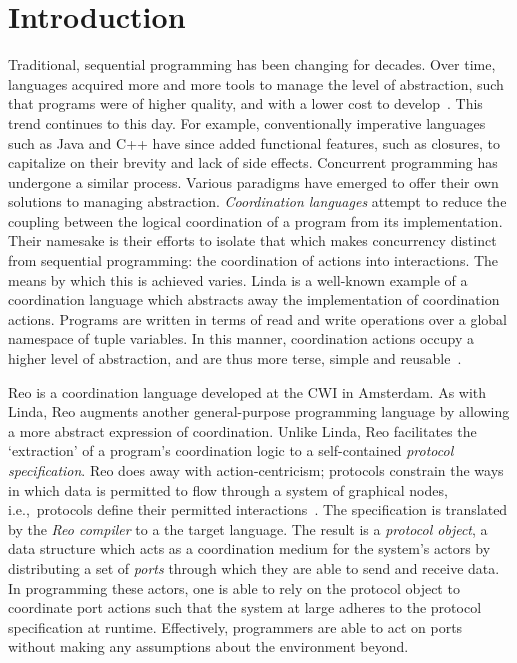 \chapter{Introduction}	


Traditional, sequential programming has been changing for decades. Over time, languages acquired more and more tools to manage the level of abstraction, such that programs were of higher quality, and with a lower cost to develop~\cite{shaw1984abstraction}. This trend continues to this day. For example, conventionally imperative languages such as Java and C++ have since added functional features, such as closures, to capitalize on their brevity and lack of side effects. Concurrent programming has undergone a similar process. Various paradigms have emerged to offer their own solutions to managing abstraction. \textit{Coordination languages} attempt to reduce the coupling between the logical coordination of a program from its implementation. Their namesake is their efforts to isolate that which makes concurrency distinct from sequential programming: the coordination of actions into interactions. The means by which this is achieved varies. Linda is a well-known example of a coordination language which abstracts away the implementation of coordination actions. Programs are written in terms of read and write operations over a global namespace of tuple variables. In this manner, coordination actions occupy a higher level of abstraction, and are thus more terse, simple and reusable~\cite{gelernter1985generative}.


Reo is a coordination language developed at the CWI in Amsterdam. As with Linda, Reo augments another general-purpose programming language by allowing a more abstract expression of coordination. Unlike Linda, Reo facilitates the `extraction' of a program's coordination logic to a self-contained \textit{protocol specification}. Reo does away with action-centricism; protocols constrain the ways in which data is permitted to flow through a system of graphical nodes, i.e.,\ protocols define their permitted interactions~\cite{arbab2005abstract}. The specification is translated by the \textit{Reo compiler} to a the target language. The result is a \textit{protocol object}, a data structure which acts as a coordination medium for the system's actors by distributing a set of \textit{ports} through which they are able to send and receive data. In programming these actors, one is able to rely on the protocol object to coordinate port actions such that the system at large adheres to the protocol specification at runtime. Effectively, programmers are able to act on ports without making any assumptions about the environment beyond.

